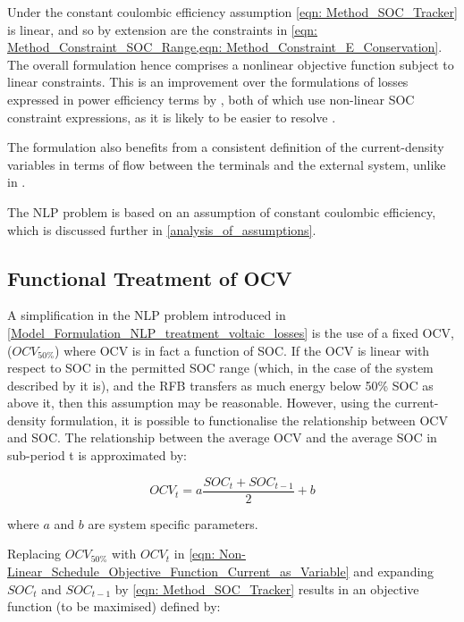 \documentclass[preprint,3p,review,authoryear,10pt]{elsarticle}
\begin{document}
Under the constant coulombic efficiency assumption \cref{eqn: Method_SOC_Tracker} is linear, and so by extension are the constraints in \cref{eqn: Method_Constraint_SOC_Range,eqn: Method_Constraint_E_Conservation}.  The overall formulation hence comprises a nonlinear objective function subject to linear constraints. This is an improvement over the formulations of losses expressed in power efficiency terms by \cite{Nguyen2015,Sarker2017}, both of which use non-linear SOC constraint expressions, as it is likely to be easier to resolve \cite{Hart2017}.

The formulation also benefits from a consistent definition of the current-density variables in terms of flow between the terminals and the external system, unlike in \cite{Sarker2017}.

The NLP problem is based on an assumption of constant coulombic efficiency, which is discussed further in \cref{analysis_of_assumptions}.

\subsection{Functional Treatment of OCV}
\label{Model_Formulation_Functional_Treatment_OCV}
A simplification in the NLP problem introduced in \cref{Model_Formulation_NLP_treatment_voltaic_losses} is the use of a fixed OCV, ($OCV_{50\%}$) where OCV is in fact a function of SOC. If the OCV is linear with respect to SOC in the permitted SOC range (which, in the case of the system described by \cite{Reed2016} it is), and the RFB transfers as much energy below 50\% SOC as above it, then this assumption may be reasonable.
However, using the current-density formulation, it is possible to functionalise the relationship between OCV and SOC. The relationship between the average OCV and the average SOC in sub-period t is approximated by:

\begin{equation}
\label{eqn: OCV_vs_SOC}
OCV_t = a\frac{SOC_t + SOC_{t-1}}{2} + b 
\end{equation}

where $a$ and $b$ are system specific parameters.

Replacing $OCV_{50\%}$ with $OCV_t$ in \cref{eqn: Non-Linear_Schedule_Objective_Function_Current_as_Variable} and expanding $SOC_t$ and $SOC_{t-1}$ by \cref{eqn: Method_SOC_Tracker} results in an objective function (to be maximised) defined by:
\end{document}
